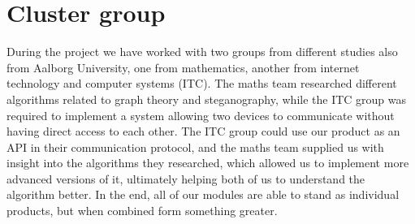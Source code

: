 \section*{Cluster group}
During the project we have worked with two groups from different studies also from Aalborg University, one from mathematics, another from internet technology and computer systems (ITC). 
The maths team researched different algorithms related to graph theory and steganography, while the ITC group was required to implement a system allowing two devices to communicate without having direct access to each other.
The ITC group could use our product as an API in their communication protocol, and the maths team supplied us with insight into the algorithms they researched, which allowed us to implement more advanced versions of it, ultimately helping both of us to understand the algorithm better.
In the end, all of our modules are able to stand as individual products, but when combined form something greater.
